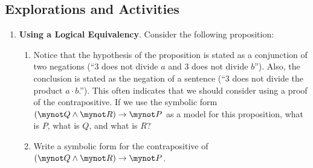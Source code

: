 \subsection*{Explorations and Activities}
\setcounter{oldenumi}{\theenumi}
\begin{enumerate} \setcounter{enumi}{\theoldenumi}


\item \textbf{Using a Logical Equivalency}.  Consider the following proposition:
%
\begin{enumerate}
  \item Notice that the hypothesis of the proposition is stated as a conjunction of two negations  (``3  does not divide  $a$  and  3  does not divide  $b$'').   Also, the conclusion is stated as the negation of a sentence  (``3 does not divide the product $a \cdot b$.''). This often indicates that we should consider using a proof of the contrapositive. If we use the symbolic form  $\left( {\mynot  Q \wedge \mynot  R} \right) \to \mynot  P$  as a model for this proposition, what is  $P$, what is  $Q$, and what is  $R$?

  \item Write a symbolic form for the contrapositive of   $\left( {\mynot  Q \wedge \mynot  R} \right) \to \mynot  P$.


\end{enumerate}
\end{enumerate}
